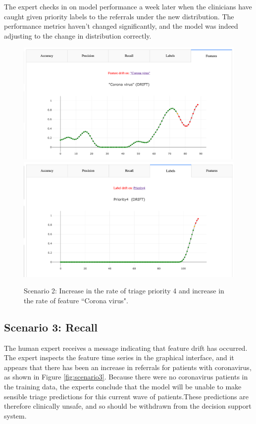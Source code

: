 The expert checks in on model performance a week later when the clinicians have caught given priority labels to the referrals under the new distribution. The performance metrics haven't changed significantly, and the model was indeed adjusting to the change in distribution correctly.

\begin{figure}
    \centering
    \includegraphics[width=\textwidth]{images/corona_virus.png}
    \includegraphics[width=\textwidth]{images/priority4.png}
    \caption{Scenario 2: Increase in the rate of triage priority 4 and increase in the rate of feature ``Corona virus".}
    \label{fig:scenario2}
\end{figure}


\subsection{Scenario 3: Recall}

The human expert receives a message indicating that feature drift has occurred. The expert inspects the feature time series in the graphical interface, and it appears that there has been an increase in referrals for patients with coronavirus, as shown in Figure \ref{fig:scenario3}. Because there were no coronavirus patients in the training data, the experts conclude that the model will be unable to make sensible triage predictions for this current wave of patients.These predictions are therefore clinically unsafe, and so should be withdrawn from the decision support system.

